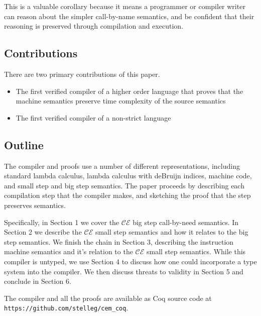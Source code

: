 This is a valuable corollary because it means a programmer or compiler writer
can reason about the simpler call-by-name semantics, and be confident that their
reasoning is preserved through compilation and execution.

\subsection{Contributions}
There are two primary contributions of this paper. 
\begin{itemize}
\item The first verified compiler of a higher order language that proves that
the machine semantics preserve time complexity of the source semantics
\item The first verified compiler of a non-strict language
\end{itemize}

\subsection{Outline}
The compiler and proofs use a number of different representations, including
standard lambda calculus, lambda calculus with deBruijn indices, machine
code, and small step and big step semantics. The paper proceeds by describing
each compilation step that the compiler makes, and sketching the proof that the
step preserves semantics.

Specifically, in Section 1 we cover the $\mathcal{CE}$ big step call-by-need
semantics. In Section 2 we describe the $\mathcal{CE}$ small step semantics and
how it relates to the big step semantics. We finish the chain in Section 3,
describing the instruction machine semantics and it's relation to the
$\mathcal{CE}$ small step semantics.  While this compiler is untyped, we use
Section 4 to discuss how one could incorporate a type system into the compiler.
We then discuss threats to validity in Section 5 and conclude in Section 6. 

The compiler and all the proofs are available as Coq source code at
\texttt{https://github.com/stelleg/cem\_coq}.


